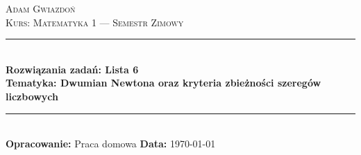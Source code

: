 \documentclass[11pt,a4paper]{article}
\begin{document}
\begin{center}
    {\scshape\Large Adam Gwiazdoń}\\[0.2cm]
    {\scshape\large Kurs: Matematyka 1 --- Semestr Zimowy}\\[0.4cm]
    \rule{\textwidth}{1.2pt}\\[0.35cm]
    {\huge\bfseries\color{navyblue} Rozwiązania zadań: Lista 6}\\[0.2cm]
    {\large\bfseries Tematyka: Dwumian Newtona oraz kryteria zbieżności szeregów liczbowych}\\[0.3cm]
    \rule{\textwidth}{0.8pt}\\[0.3cm]
    {\small \textbf{Opracowanie:} Praca domowa \quad\textbullet\quad \textbf{Data:} \today}
\end{center}

\vspace{0.4cm}

\begin{abstract}
\noindent Niniejszy dokument zawiera kompletne, formalne i szczegółowe rozwiązania wszystkich zadań z \textbf{Listy 6} z przedmiotu \emph{Matematyka 1}. Każde zadanie rozpoczyna się od przytoczenia pełnej treści, po czym następuje zestawienie niezbędnego aparatu pojęciowego, definicji, twierdzeń oraz kryteriów analitycznych. W dalszej części przedstawiono wyczerpujące kroki analityczne i algebraiczne wraz z uzasadnieniem każdego przejścia, a całość zwieńczona jest jednoznacznym podsumowaniem.
\end{abstract}

\vspace{0.3cm}
{
\hypersetup{linkcolor=charcoal}
\tableofcontents
}
\vspace{0.5cm}


\clearpage


\clearpage


\clearpage


\clearpage


\clearpage

\end{document}
